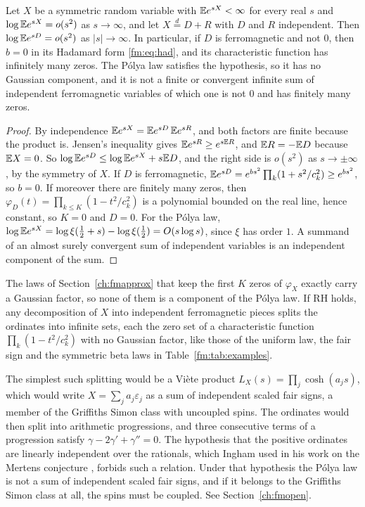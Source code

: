 \begin{theorem}\label{fm:thm:nosqrt}
Let $X$ be a symmetric random variable with $\mathbb{E} e^{sX}<\infty$ for every real $s$ and $\log\mathbb{E} e^{sX}=o(s^2)$ as $s\to\infty$, and let $X\overset d=D+R$ with $D$ and $R$ independent. Then $\log\mathbb{E} e^{sD}=o(s^2)$ as $|s|\to\infty$. In particular, if $D$ is ferromagnetic and not $0$, then $b=0$ in its Hadamard form \eqref{fm:eq:had}, and its characteristic function has infinitely many zeros. The P\'olya law satisfies the hypothesis, so it has no Gaussian component, and it is not a finite or convergent infinite sum of independent ferromagnetic variables of which one is not $0$ and has finitely many zeros.
\end{theorem}

\begin{proof}
By independence $\mathbb{E} e^{sX}=\mathbb{E} e^{sD}\,\mathbb{E} e^{sR}$, and both factors are finite because the product is. Jensen's inequality gives $\mathbb{E} e^{sR}\ge e^{s\mathbb{E} R}$, and $\mathbb{E} R=-\mathbb{E} D$ because $\mathbb{E} X=0$. So $\log\mathbb{E} e^{sD}\le\log\mathbb{E} e^{sX}+s\mathbb{E} D$, and the right side is $o(s^2)$ as $s\to\pm\infty$, by the symmetry of $X$. If $D$ is ferromagnetic, $\mathbb{E} e^{sD}=e^{bs^2}\prod_k(1+s^2/c_k^2)\ge e^{bs^2}$, so $b=0$. If moreover there are finitely many zeros, then $\varphi_D(t)=\prod_{k\le K}(1-t^2/c_k^2)$ is a polynomial bounded on the real line, hence constant, so $K=0$ and $D=0$. For the P\'olya law, $\log\mathbb{E} e^{sX}=\log\xi(\frac12+s)-\log\xi(\frac12)=O(s\log s)$, since $\xi$ has order $1$. A summand of an almost surely convergent sum of independent variables is an independent component of the sum.
\end{proof}

The laws of Section~\ref{ch:fmapprox} that keep the first $K$ zeros of $\varphi_X$ exactly carry a Gaussian factor, so none of them is a component of the P\'olya law. If RH holds, any decomposition of $X$ into independent ferromagnetic pieces splits the ordinates into infinite sets, each the zero set of a characteristic function $\prod_k(1-t^2/c_k^2)$ with no Gaussian factor, like those of the uniform law, the fair sign and the symmetric beta laws in Table~\ref{fm:tab:examples}.

The simplest such splitting would be a Vi\`ete product $L_X(s)=\prod_j\cosh(a_js)$, which would write $X=\sum_ja_j\varepsilon_j$ as a sum of independent scaled fair signs, a member of the Griffiths Simon class with uncoupled spins. The ordinates would then split into arithmetic progressions, and three consecutive terms of a progression satisfy $\gamma-2\gamma'+\gamma''=0$. The hypothesis that the positive ordinates are linearly independent over the rationals, which Ingham used in his work on the Mertens conjecture \cite{Ingham42}, forbids such a relation. Under that hypothesis the P\'olya law is not a sum of independent scaled fair signs, and if it belongs to the Griffiths Simon class at all, the spins must be coupled. See Section~\ref{ch:fmopen}.

